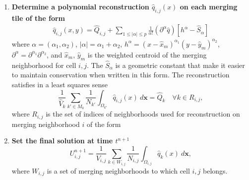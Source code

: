 \begin{enumerate}
\item \textbf{Determine a polynomial reconstruction $\hat q_{i,j}(x)$ on 
each merging tile of the form}
\begin{equation}\label{eq:q}
\begin{aligned}
    \hat q_{i,j} (x,y) = \widehat{Q}_{i,j} +  \sum_{1 \leq |\alpha| \leq p}  \frac{1}{\alpha!} (\partial^{\alpha} \hat q) [h^{\alpha}-\hat S_{\alpha}]
\end{aligned}
\end{equation}
where $\alpha = (\alpha_1, \alpha_2)$, $|\alpha| = \alpha_1 + \alpha_2$, $h^{\alpha} = (x-\hat x_m)^{\alpha_1}(y-\hat y_m)^{\alpha_2}$, $\partial^{\alpha} = \partial^{\alpha_1}\partial^{\alpha_2}$,
and $\hat x_m$, $\hat y_m$ is the weighted centroid of the merging
neighborhood for cell $i,j$. 
The $ \hat S_{\alpha}$ is a geometric
constant that make it easier to maintain conservation when written in
this form.  The reconstruction satisfies in a least squares sense
\begin{equation}\label{eq:qi}
\frac{1}{\hat{V}_{k}}\sum_{k' \in M_{k}}\frac{1}{N_{k'}}\int_{\Omega_{k'}} \hat q_{i,j}(x)~d\mathbf{x} = \hat Q_{k} \quad \forall k \in R_{i,j},
\end{equation}
where $R_{i,j}$ is the set of indices of neighborhoods used for reconstruction 
on merging neighborhood $i$ of the form


\item \textbf{Set the final solution at time $t^{n+1}$}
	\begin{equation}\label{eq:final_update}
	U^{n+1}_{i,j} =  \frac{1}{V_{i,j}}\sum_{k \in W_{i,j}}\frac{1}{N_{i,j}}\int_{\Omega_{i,j}} \hat q_{k}(x)~d\mathbf{x} ,
	\end{equation}
	where $W_{i,j}$ is a set of merging neighborhoods to which cell $i,j$ belongs.
\end{enumerate}


